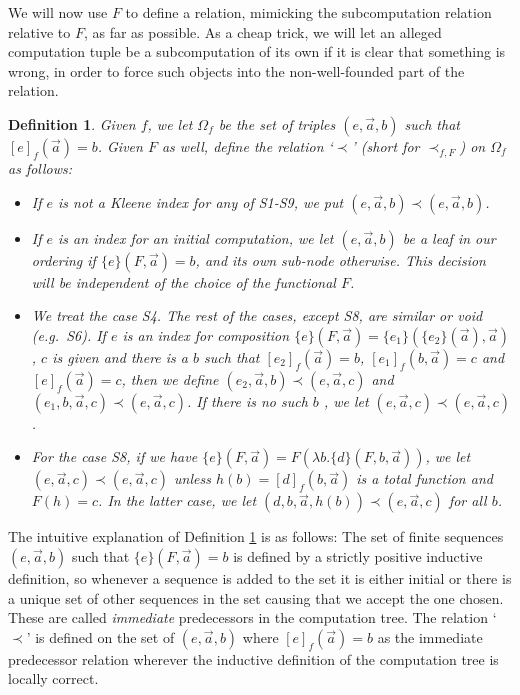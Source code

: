 \documentclass[reqno]{amsart}
\newtheorem{defi}[thm]{Definition}
\def\({\textup{(}}
\def\){\textup{)}}
\numberwithin{equation}{section}
\numberwithin{thm}{section}
\begin{document}
We will now use $F$ to define a relation, mimicking the subcomputation relation relative to $F$, as far as possible. As a cheap trick, we will let an alleged computation tuple be a subcomputation of its own if it is clear that something is wrong, in order to force such objects into the non-well-founded part of the relation.
\begin{defi}\label{formdix}\rm
Given $f$, we let $\Omega_f$ be the set of triples  $(e,\vec a,b)$ such that $[e]_f(\vec a) = b$. Given $F$ as well, define the relation `$\prec$' \(short for $\prec_{f,F}$\) on $\Omega_f$ as follows:
\begin{itemize}
\item If $e$ is not a Kleene index for any of S1-S9, we put $(e,\vec a , b) \prec (e , \vec a , b)$.
\item If $e$ is an index for an initial computation, we let $(e,\vec a , b)$ be a leaf in our ordering if $\{e\}(F,\vec a) = b$, and its own sub-node otherwise. 
This decision will be independent of the choice of the functional $F$.
\item We treat the case S4. The rest of the cases, except S8, are similar or void (e.g.\ S6).
If $e$ is an index for composition  
$\{e\}(F,\vec a) = \{e_1\}(\{e_2\}(\vec a),\vec a)$, $c$ is given and there is a $b$ such that
$ [e_2]_f(\vec a) = b$, $[e_1]_f(b,\vec a) = c$ and $[e]_f(\vec a) = c$,
then we define $(e_2,\vec a , b) \prec (e,\vec a , c)$ and $(e_1, b,\vec a,c) \prec (e,\vec a, c)$.  If there is no such $b$ , we let $(e,\vec a, c) \prec (e,\vec a, c)$.
\item For the case S8, if we have $\{e\}(F,\vec a) = F(\lambda b.\{d\}(F,b,\vec a))$, we let $(e,\vec a, c) \prec (e,\vec a, c)$ unless $h(b) = [d]_f(b,\vec a)$ is a total function and  $F(h) = c$.
In the latter case, we let $(d,b,\vec a , h(b)) \prec (e,\vec a , c)$ for all $b$.
\end{itemize}
\end{defi}
The intuitive explanation of Definition \ref{formdix} is as follows: The set of finite sequences $(e,\vec a , b)$ such that $\{e\}(F,\vec a  ) = b$ is defined by a strictly positive inductive definition, so whenever a sequence is added to the set it is either initial or there is a unique set of other sequences in the set causing that we accept the one chosen. These are called \emph{immediate} predecessors in the computation tree. The relation `$\prec$' is defined on the set of $(e,\vec a , b)$ where $[e]_f(\vec a) = b$ as the immediate predecessor relation wherever the inductive definition of the computation tree is locally correct. 
\end{document}
